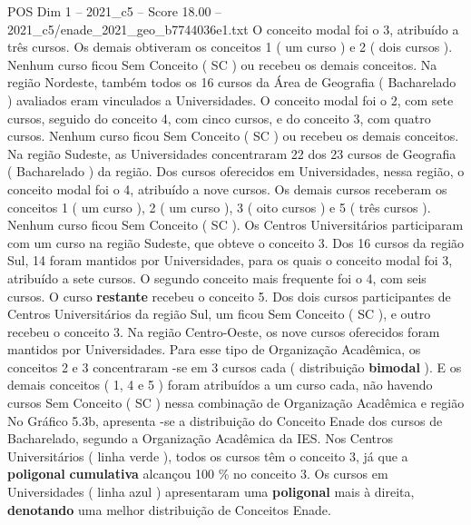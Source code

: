 \begin{textsample}{POS Dim 1 – 2021\_c5 – Score 18.00 – 2021\_c5/enade\_2021\_geo\_b7744036e1.txt}
O conceito modal foi o 3, atribuído a três cursos.
Os demais obtiveram os conceitos 1 ( um curso ) e 2 ( dois cursos ).
Nenhum curso ficou Sem Conceito ( SC ) ou recebeu os demais conceitos.
Na região Nordeste, também todos os 16 cursos da Área de Geografia ( Bacharelado ) avaliados eram vinculados a Universidades.
O conceito modal foi o 2, com sete cursos, seguido do conceito 4, com cinco cursos, e do conceito 3, com quatro cursos.
Nenhum curso ficou Sem Conceito ( SC ) ou recebeu os demais conceitos.
Na região Sudeste, as Universidades concentraram 22 dos 23 cursos de Geografia ( Bacharelado ) da região.
Dos cursos oferecidos em Universidades, nessa região, o conceito modal foi o 4, atribuído a nove cursos.
Os demais cursos receberam os conceitos 1 ( um curso ), 2 ( um curso ), 3 ( oito cursos ) e 5 ( três cursos ).
Nenhum curso ficou Sem Conceito ( SC ).
Os Centros Universitários participaram com um curso na região Sudeste, que obteve o conceito 3.
Dos 16 cursos da região Sul, 14 foram mantidos por Universidades, para os quais o conceito modal foi 3, atribuído a sete cursos.
O segundo conceito mais frequente foi o 4, com seis cursos.
O curso \textbf{restante} recebeu o conceito 5.
Dos dois cursos participantes de Centros Universitários da região Sul, um ficou Sem Conceito ( SC ), e outro recebeu o conceito 3.
Na região Centro-Oeste, os nove cursos oferecidos foram mantidos por Universidades.
Para esse tipo de Organização Acadêmica, os conceitos 2 e 3 concentraram -se em 3 cursos cada ( distribuição \textbf{bimodal} ).
E os demais conceitos ( 1, 4 e 5 ) foram atribuídos a um curso cada, não havendo cursos Sem Conceito ( SC ) nessa combinação de Organização Acadêmica e região No Gráfico 5.3b, apresenta -se a distribuição do Conceito Enade dos cursos de Bacharelado, segundo a Organização Acadêmica da IES.
Nos Centros Universitários ( linha verde ), todos os cursos têm o conceito 3, já que a \textbf{poligonal} \textbf{cumulativa} alcançou 100 \% no conceito 3.
Os cursos em Universidades ( linha azul ) apresentaram uma \textbf{poligonal} mais à direita, \textbf{denotando} uma melhor distribuição de Conceitos Enade.

\end{textsample}
